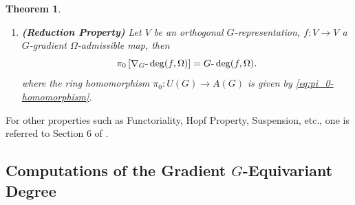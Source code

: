 \documentclass{amsart}%
\newtheorem{theorem}{Theorem}
\begin{document}
\begin{theorem}
\begin{enumerate}
\item \textrm{\textbf{(Reduction Property)}} Let $V$ be an orthogonal
$G$-representation, $f:V\to V$ a $G$-gradient $\Omega$-admissible map, then
\begin{equation}
\label{eq:red-G}\pi_{0}\left[  \nabla_{G}\mbox{\rm -}\deg(f,\Omega)\right]
=G\mbox{\rm -}\deg(f,\Omega).
\end{equation}
where the ring homomorphism $\pi_{0}:U(G)\to A(G)$ is given by \eqref{eq:pi_0-homomorphism}.
\end{enumerate}
\end{theorem}
For other properties such as Functoriality, Hopf Property, Suspension, etc., one is referred to Section 6 of \cite{DK}.

\vskip0.3cm 

\subsection{Computations of the Gradient \texorpdfstring{$G$}{G}-Equivariant Degree}
\end{document}
